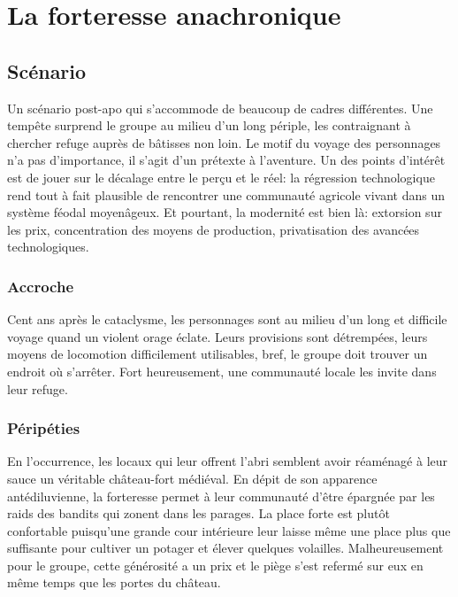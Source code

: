 \chapter{La forteresse anachronique}

\section{Scénario}

Un scénario post-apo qui s'accommode de beaucoup de cadres différentes.
Une tempête surprend le groupe au milieu d'un long périple, les contraignant à chercher refuge auprès de bâtisses non loin.
Le motif du voyage des personnages n'a pas d'importance, il s'agit d'un prétexte à l'aventure.
Un des points d'intérêt est de jouer sur le décalage entre le perçu et le réel: la régression technologique rend tout à fait plausible de rencontrer une communauté agricole vivant dans un système féodal moyenâgeux. Et pourtant, la modernité est bien là: extorsion sur les prix, concentration des moyens de production, privatisation des avancées technologiques.

\subsection{Accroche}

Cent ans après le cataclysme, les personnages sont au milieu d'un long et difficile voyage quand un violent orage éclate.
Leurs provisions sont détrempées, leurs moyens de locomotion difficilement utilisables, bref, le groupe doit trouver un endroit où s'arrêter.
Fort heureusement, une communauté locale les invite dans leur refuge.


\subsection{Péripéties}

En l'occurrence, les locaux qui leur offrent l'abri semblent avoir réaménagé à leur sauce un véritable château-fort médiéval.
En dépit de son apparence antédiluvienne, la forteresse permet à leur communauté d'être épargnée par les raids des bandits qui zonent dans les parages.
La place forte est plutôt confortable puisqu'une grande cour intérieure leur laisse même une place plus que suffisante pour cultiver un potager et élever quelques volailles.
Malheureusement pour le groupe, cette générosité a un prix et le piège s'est refermé sur eux en même temps que les portes du château.

